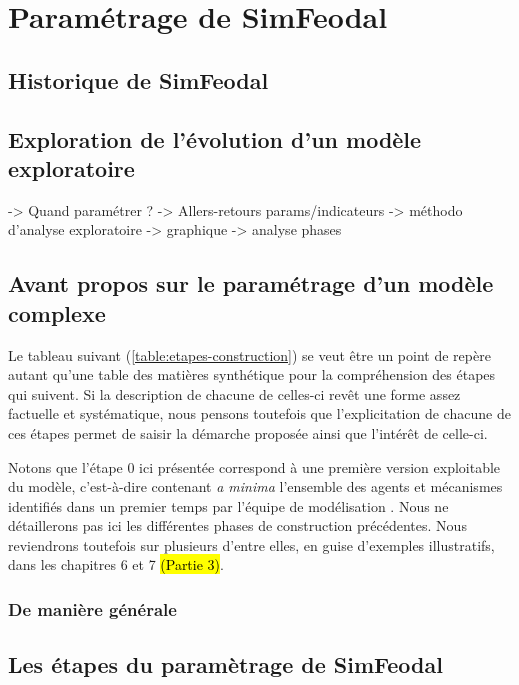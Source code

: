\clearpage
\section{Paramétrage de SimFeodal}

\subsection{Historique de SimFeodal}

\subsection{Exploration de l'évolution d'un modèle exploratoire}
 -> Quand paramétrer ?
 	-> Allers-retours params/indicateurs
 -> méthodo d'analyse exploratoire
 	-> graphique
 	-> analyse phases


\subsection{Avant propos sur le paramétrage d'un modèle complexe}


Le tableau suivant (\cref{table:etapes-construction}) se veut être un point de repère autant qu'une table des matières synthétique pour la compréhension des étapes qui suivent.
Si la description de chacune de celles-ci revêt une forme assez factuelle et systématique, nous pensons toutefois que l'explicitation de chacune de ces étapes permet de saisir la démarche proposée ainsi que l'intérêt de celle-ci.

Notons que l'étape 0 ici présentée correspond à une première version \og exploitable\fg{} du modèle, c'est-à-dire contenant \textit{a minima} l'ensemble des agents et mécanismes identifiés dans un premier temps par l'équipe de modélisation \autocite{tannier_ontologie_2014}.
Nous ne détaillerons pas ici les différentes phases de construction précédentes. Nous reviendrons toutefois sur plusieurs d'entre elles, en guise d'exemples illustratifs, dans les chapitres 6 et 7 \hl{(Partie 3)}.

\subsubsection{De manière générale}

\subsection{Les étapes du paramètrage de SimFeodal}

